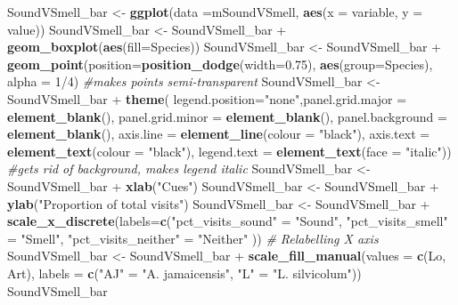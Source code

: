 \documentclass[]{article}
\newenvironment{Shaded}{\begin{snugshade}}{\end{snugshade}}
\newcommand{\KeywordTok}[1]{\textcolor[rgb]{0.13,0.29,0.53}{\textbf{{#1}}}}
\newcommand{\DataTypeTok}[1]{\textcolor[rgb]{0.13,0.29,0.53}{{#1}}}
\newcommand{\DecValTok}[1]{\textcolor[rgb]{0.00,0.00,0.81}{{#1}}}
\newcommand{\FloatTok}[1]{\textcolor[rgb]{0.00,0.00,0.81}{{#1}}}
\newcommand{\StringTok}[1]{\textcolor[rgb]{0.31,0.60,0.02}{{#1}}}
\newcommand{\CommentTok}[1]{\textcolor[rgb]{0.56,0.35,0.01}{\textit{{#1}}}}
\newcommand{\NormalTok}[1]{{#1}}
\begin{document}
\begin{Shaded}
\begin{Highlighting}[]
\NormalTok{SoundVSmell_bar <-}\StringTok{ }\KeywordTok{ggplot}\NormalTok{(}\DataTypeTok{data =}\NormalTok{mSoundVSmell, }\KeywordTok{aes}\NormalTok{(}\DataTypeTok{x =} \NormalTok{variable, }\DataTypeTok{y =} \NormalTok{value))}
\NormalTok{SoundVSmell_bar <-}\StringTok{ }\NormalTok{SoundVSmell_bar +}\StringTok{ }\KeywordTok{geom_boxplot}\NormalTok{(}\KeywordTok{aes}\NormalTok{(}\DataTypeTok{fill=}\NormalTok{Species))}
\NormalTok{SoundVSmell_bar <-}\StringTok{ }\NormalTok{SoundVSmell_bar +}\StringTok{ }\KeywordTok{geom_point}\NormalTok{(}\DataTypeTok{position=}\KeywordTok{position_dodge}\NormalTok{(}\DataTypeTok{width=}\FloatTok{0.75}\NormalTok{), }\KeywordTok{aes}\NormalTok{(}\DataTypeTok{group=}\NormalTok{Species), }\DataTypeTok{alpha =} \DecValTok{1}\NormalTok{/}\DecValTok{4}\NormalTok{) }\CommentTok{#makes points semi-transparent}
\NormalTok{SoundVSmell_bar <-}\StringTok{ }\NormalTok{SoundVSmell_bar +}\StringTok{  }\KeywordTok{theme}\NormalTok{( }\DataTypeTok{legend.position=}\StringTok{"none"}\NormalTok{,}\DataTypeTok{panel.grid.major =} \KeywordTok{element_blank}\NormalTok{(), }\DataTypeTok{panel.grid.minor =} \KeywordTok{element_blank}\NormalTok{(),}
\DataTypeTok{panel.background =} \KeywordTok{element_blank}\NormalTok{(), }\DataTypeTok{axis.line =} \KeywordTok{element_line}\NormalTok{(}\DataTypeTok{colour =} \StringTok{"black"}\NormalTok{), }\DataTypeTok{axis.text =} \KeywordTok{element_text}\NormalTok{(}\DataTypeTok{colour =} \StringTok{"black"}\NormalTok{), }\DataTypeTok{legend.text =} \KeywordTok{element_text}\NormalTok{(}\DataTypeTok{face =} \StringTok{"italic"}\NormalTok{))  }\CommentTok{#gets rid of background, makes legend italic}
\NormalTok{SoundVSmell_bar <-}\StringTok{ }\NormalTok{SoundVSmell_bar +}\StringTok{ }\KeywordTok{xlab}\NormalTok{(}\StringTok{"Cues"}\NormalTok{)}
\NormalTok{SoundVSmell_bar <-}\StringTok{ }\NormalTok{SoundVSmell_bar +}\StringTok{ }\KeywordTok{ylab}\NormalTok{(}\StringTok{"Proportion of total visits"}\NormalTok{)}
\NormalTok{SoundVSmell_bar <-}\StringTok{ }\NormalTok{SoundVSmell_bar +}\StringTok{ }\KeywordTok{scale_x_discrete}\NormalTok{(}\DataTypeTok{labels=}\KeywordTok{c}\NormalTok{(}\StringTok{"pct_visits_sound"} \NormalTok{=}\StringTok{ "Sound"}\NormalTok{, }\StringTok{"pct_visits_smell"} \NormalTok{=}\StringTok{ "Smell"}\NormalTok{,}
                              \StringTok{"pct_visits_neither"} \NormalTok{=}\StringTok{ "Neither"} \NormalTok{))  }\CommentTok{# Relabelling X axis}
\NormalTok{SoundVSmell_bar <-}\StringTok{ }\NormalTok{SoundVSmell_bar +}\StringTok{ }\KeywordTok{scale_fill_manual}\NormalTok{(}\DataTypeTok{values =} \KeywordTok{c}\NormalTok{(Lo, Art), }\DataTypeTok{labels =} \KeywordTok{c}\NormalTok{(}\StringTok{"AJ"} \NormalTok{=}\StringTok{ "A. jamaicensis"}\NormalTok{, }\StringTok{"L"} \NormalTok{=}\StringTok{ "L. silvicolum"}\NormalTok{))}
\NormalTok{SoundVSmell_bar}
\end{Highlighting}
\end{Shaded}
\end{document}
